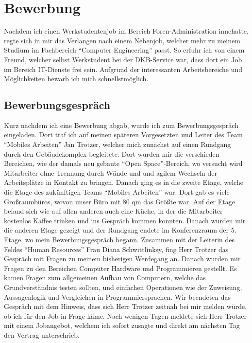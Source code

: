 \section{Bewerbung}
\label{sec:Bewerbung}

Nachdem ich einen Werkstudentenjob im Bereich Foren-Administration innehatte, regte sich in mir das Verlangen nach einem Nebenjob, welcher mehr zu meinem Studium im Fachbereich “Computer Engineering” passt. So erfuhr ich von einem Freund, welcher selbst Werkstudent bei der DKB-Service war, dass dort ein Job im Bereich IT-Dienste frei sein. 
Aufgrund der interessanten Arbeitsbereiche und Möglichkeiten bewarb ich mich schnellstmöglich.

\subsection{Bewerbungsgespräch}
\label{sec:Bewerbungsgespräch}

Kurz nachdem ich eine Bewerbung abgab, wurde ich zum Bewerbungsgespräch eingeladen. Dort traf ich auf meinen späteren Vorgesetzten und Leiter des Team “Mobiles Arbeiten” Jan Trotzer, welcher mich zunächst auf einen Rundgang durch den Gebäudekomplex begleitete. Dort wurden mir die verschieden Bereichen, wie der damals neu gebaute “Open Space”-Bereich, wo versucht wird Mitarbeiter ohne Trennung durch Wände und und agilem Wechseln der Arbeitsplätze in Kontakt zu bringen. Danach ging es in die zweite Etage, welche die Etage des zukünftigen Teams “Mobiles Arbeiten” war. Dort gab es viele Großraumbüros, wovon unser Büro mit 80 qm das Größte war. Auf der Etage befand sich wie auf allen anderen auch eine Küche, in der die Mitarbeiter kostenlos Kaffee trinken und ins Gespräch kommen konnten. Danach wurden mir die anderen Etage gezeigt und der Rundgang endete im Konferenzraum der 5. Etage, wo mein Bewerbungsgespräch begann. Zusammen mit der Leiterin des Feldes “Human Resources” Frau Diana Schwittlinksy, fing Herr Trotzer das Gespräch mit Fragen zu meinem bisherigen Werdegang an. Danach wurden mir Fragen zu den Bereichen Computer Hardware und Programmieren gestellt. Es kamen Fragen zum allgemeinen Aufbau von Computern, welche das Grundverständnis testen sollten, und einfachen Operationen wie der Zuweisung, Aussagenlogik und Vergleichen in Programmiersprachen. Wir beendeten das Gespräch mit dem Hinweis, dass sich Herr Trotzer zeitnah bei mir melden würde, ob ich für den Job in Frage käme. Nach wenigen Tagen meldete sich Herr Trotzer mit einem Jobangebot, welchem ich sofort zusagte und direkt am nächsten Tag den Vertrag unterschrieb. 


